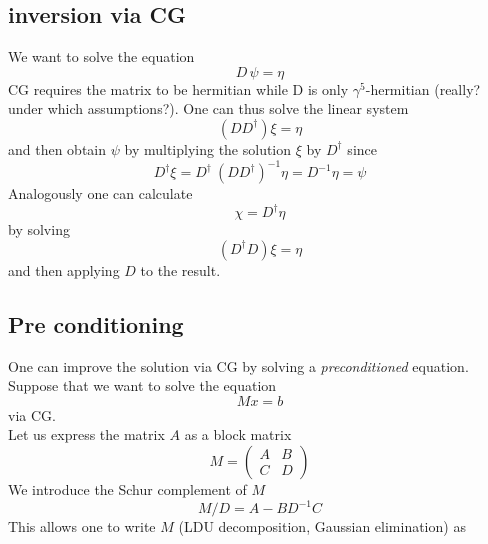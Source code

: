 \subsection{inversion via CG}
We want to solve the equation
\begin{equation*} 
    D \, \psi = \eta
\end{equation*}
CG requires the matrix to be hermitian while D is only $\gamma^5$-hermitian (really? under which assumptions?). One can thus solve the linear system
\begin{equation*}
    \left(D D^{\dagger} \right) \xi = \eta
\end{equation*}
and then obtain $\psi$ by multiplying the solution $\xi$ by $D^{\dagger}$ since 
\begin{equation}
    D^{\dagger} \xi = D^{\dagger} \ \left(D D^{\dagger}\right)^{-1} \eta = D^{-1} \eta = \psi
\end{equation}
Analogously one can calculate
\begin{equation*}
    \chi = D^{\dagger} \eta
\end{equation*}
by solving
\begin{equation*}
    \left(D^{\dagger} D\right) \xi = \eta
\end{equation*}
and then applying $D$ to the result.

\subsection{Pre conditioning}
One can improve the solution via CG by solving a \emph{preconditioned} equation. Suppose that we want to solve the equation
\begin{equation*}
    M x = b
\end{equation*}
via CG. \\
Let us express the matrix $A$ as a block matrix
\begin{equation}
    M = \begin{pmatrix*}
        A & B \\ C & D
    \end{pmatrix*}
    \label{eq:block_matrix}
\end{equation}
We introduce the Schur complement of $M$
\begin{equation}
    M/D = A - B D^{-1} C
    \label{eq:schur_complement}
\end{equation}
This allows one to write $M$ (LDU decomposition, Gaussian elimination) as 

